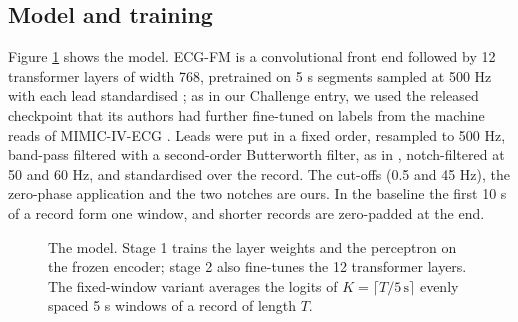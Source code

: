 \documentclass{iopjournal}
\begin{document}
\subsection{Model and training}
\label{sec:model}
Figure \ref{fig:pipeline} shows the model. ECG-FM is a convolutional front end followed by 12 transformer layers of width 768, pretrained on 5 s segments sampled at 500 Hz with each lead standardised \citep{mckeen2025}; as in our Challenge entry, we used the released checkpoint that its authors had further fine-tuned on labels from the machine reads of MIMIC-IV-ECG \citep{gow2023}. Leads were put in a fixed order, resampled to 500 Hz, band-pass filtered with a second-order Butterworth filter, as in \citet{hong2025}, notch-filtered at 50 and 60 Hz, and standardised over the record. The cut-offs (0.5 and 45 Hz), the zero-phase application and the two notches are ours. In the baseline the first 10 s of a record form one window, and shorter records are zero-padded at the end.

\begin{figure}
\centering
{}
\caption{The model. Stage 1 trains the layer weights and the perceptron on the frozen encoder; stage 2 also fine-tunes the 12 transformer layers. The fixed-window variant averages the logits of $K=\lceil T/5\,\mathrm{s}\rceil$ evenly spaced 5 s windows of a record of length $T$.}
\label{fig:pipeline}
\end{figure}
\end{document}
